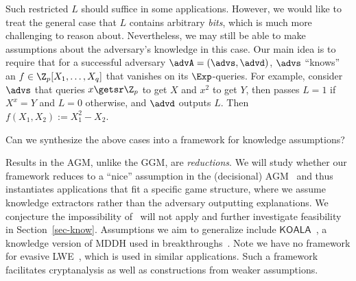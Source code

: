 {\begin{itemize}
Such restricted $L$ should suffice in some applications.
However, we would like to treat the general case that $L$  contains arbitrary \emph{bits}, which is much more challenging to reason about.
Nevertheless, we may still be able to make assumptions about the adversary's knowledge in this case. Our main idea is to require that for a successful adversary $\advA = (\advs,\advd)$, $\advs$ ``knows'' an $f \in \Z_p[X_1,\ldots,X_q]$ that vanishes on its $\Exp$-queries. For example, consider  $\advs$ that queries $x \getsr \Z_p$ to get $X$ and $x^2$ to get $Y$, then passes $L = 1$ if $X^x = Y$ and $L=0$ otherwise, and $\advd$ outputs  $L$. Then $f(X_1,X_2) := X_1^2 - X_2$.

\begin{ques}
    Can we synthesize the above cases into a   framework for  knowledge assumptions?   
    \end{ques}


Results in the AGM, unlike the GGM, are \emph{reductions}. We will study whether our  framework reduces to a ``nice'' assumption in the (decisional) AGM~\cite{C:FucKilLos18,TCC:RotSeg20} and thus instantiates applications that  fit a specific game structure, where we assume knowledge  extractors rather than the adversary outputting explanations. We conjecture the impossibility of~\cite{C:Zhandry22b} will not apply and  further investigate feasibility in Section~\ref{sec-know}. 
Assumptions we  aim to generalize  include $\mathsf{KOALA}$~\cite{PKC:BeuWee19,TCC:AgrWicYam20}, a knowledge version of MDDH  used in  breakthroughs~\cite{EC:AgrYam20,TCC:AgrWicYam20, C:AgrYadYam22}. 
   Note we have no  framework for evasive LWE~\cite{EC:Wee22}, which is used in similar applications.  Such a framework facilitates cryptanalysis as well as constructions from weaker assumptions.
   

\end{itemize}}
